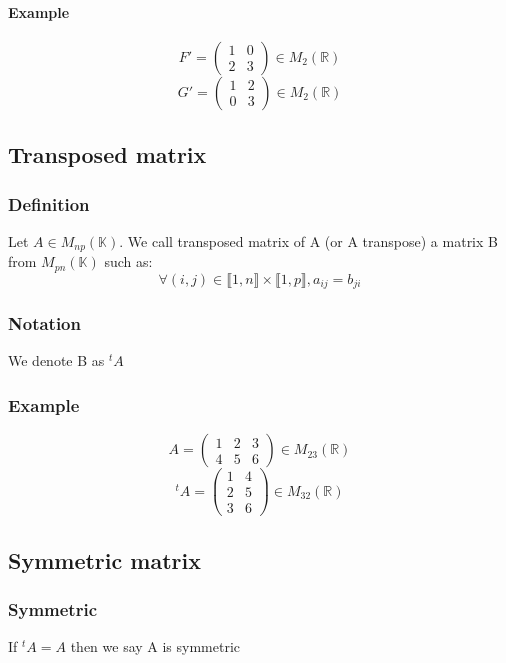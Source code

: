 \documentclass[notitlepage]{math}
\begin{document}
    \paragraph{Example}
    \[ F' = \begin{pmatrix}
        1 & 0 \\
        2 & 3
    \end{pmatrix} \in M_{2}(\mathbb{R})\]
    \[ G' = \begin{pmatrix}
        1 & 2 \\
        0 & 3
    \end{pmatrix} \in M_{2}(\mathbb{R})\]

\subsection{Transposed matrix}
    \subsubsection{Definition}
        Let $A \in M_{np}(\mathbb{K})$. We call transposed matrix of A (or A transpose) a matrix B from $M_{pn}(\mathbb{K})$ such as:
        \[ \forall (i,j) \in \llbracket 1,n \rrbracket \times \llbracket 1,p \rrbracket, a_{ij} = b_{ji}\]
    \subsubsection{Notation}
    We denote B as ${}^t \! A$
    \subsubsection{Example}
    
    \[ A = \begin{pmatrix}
        1 & 2 & 3 \\
        4 & 5 & 6
    \end{pmatrix} \in M_{23}(\mathbb{R})\]
    \[ {}^t \! A = \begin{pmatrix}
        1 & 4 \\
        2 & 5 \\
        3 & 6
    \end{pmatrix} \in M_{32}(\mathbb{R})\]


\subsection{Symmetric matrix}
    \subsubsection{Symmetric}
        If $ {}^t \! A = A $ then we say A is symmetric
\end{document}
